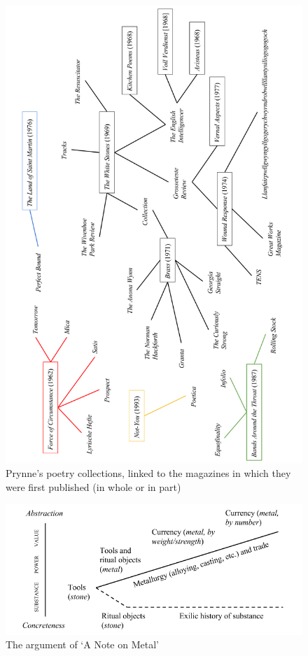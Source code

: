 \documentclass[]{article}
\begin{document}
\begin{figure}[htbp]
\centering
\includegraphics{figs/mags.png}
\caption{Prynne’s poetry collections, linked to the magazines in which
they were first published (in whole or in part)\label{fig:mags}}
\end{figure}

\newpage

\begin{figure}[htbp]
\centering
\includegraphics{figs/anm.png}
\caption{The argument of ‘A Note on Metal’\label{fig:anm}}
\end{figure}
\end{document}
